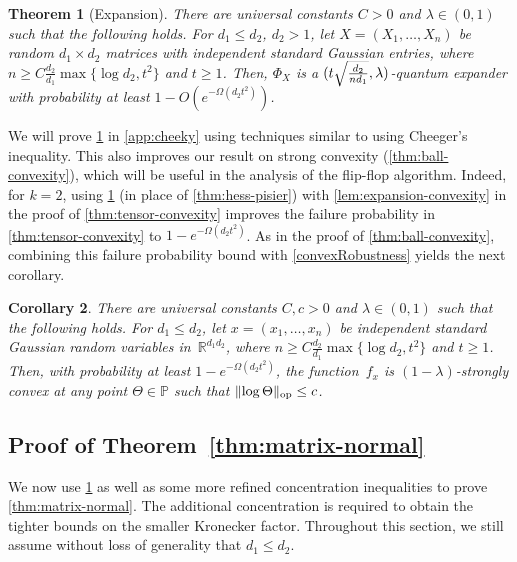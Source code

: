 \documentclass[aos]{imsart}
\newtheorem{theorem}{Theorem}[section]
\newtheorem{corollary}[theorem]{Corollary}
\theoremstyle{definition}
\numberwithin{equation}{section}
\DeclareMathOperator{\op}{op}
\DeclarePairedDelimiter{\norm}{\lVert}{\rVert}
\newcommand{\R}{{\mathbb{R}}}
\renewcommand{\P}{{\mathbb{P}}}
\newcommand{\samp}{x}
\def\dmax{d_{\max}}
\newcommand{\AR}[1]{{\color{orange}[AR: #1]}}
\newcommand{\AR}[1]{{}}
\begin{document}
\begin{theorem}[Expansion]\label{thm:operator-cheeger}
There are universal constants $C > 0$ and $\lambda\in(0,1)$ such that the following holds.
For $d_1 \leq d_2$, $d_2>1$, let $X=(X_1,\dots,X_n)$ be random $d_1 \times d_2$ matrices with independent standard Gaussian entries, where $n \geq C \frac{d_2}{d_1} \max\{\log d_2, t^2\}$ and $t\geq1$.
Then, $\Phi_X$ is a $(t \smash{\sqrt{\frac{d_2}{n d_1}}}, \lambda)$-quantum expander with probability at least $1 - O(e^{ - \Omega( d_2 t^2)})$.
\end{theorem}

We will prove \cref{thm:operator-cheeger} in \cref{app:cheeky} using techniques similar to \cite{FM20} using Cheeger's inequality.
This also improves our result on strong convexity (\cref{thm:ball-convexity}), which will be useful in the analysis of the flip-flop algorithm.
Indeed, for $k = 2$, using \cref{thm:operator-cheeger} (in place of \cref{thm:hess-pisier}) with \cref{lem:expansion-convexity} in the proof of \cref{thm:tensor-convexity} improves the failure probability in \cref{thm:tensor-convexity} to $1 - e^{ - \Omega( d_2 t^2)}$.
As in the proof of \cref{thm:ball-convexity}, combining this failure probability bound with \cref{convexRobustness} yields the next corollary.

\begin{corollary}\label{cor:matrix-convexity}
There are universal constants $C, c > 0$ and $\lambda\in(0,1)$ such that the following holds.
For $d_1 \leq d_2$, let $x=(x_1,\dots,x_n)$ be independent standard Gaussian random variables in~$\R^{d_1d_2}$, where $n \geq C \frac{d_2}{d_1} \max\{\log d_2, t^2 \}$ and $t\geq1$.
Then, with probability at least $1 - e^{ - \Omega( d_2 t^2)}$, the function~$f_x$ is $(1-\lambda)$-strongly convex at any point $\Theta\in\P$ such that $\norm{\log\Theta}_{\op} \leq c$.
\end{corollary}



\subsection{Proof of Theorem~\ref{thm:matrix-normal}}
We now use \cref{thm:operator-cheeger} as well as some more refined concentration inequalities to prove \cref{thm:matrix-normal}.
The additional concentration is required to obtain the tighter bounds on the smaller Kronecker factor.
Throughout this section, we still assume without loss of generality that $d_1 \leq d_2$.
\end{document}
